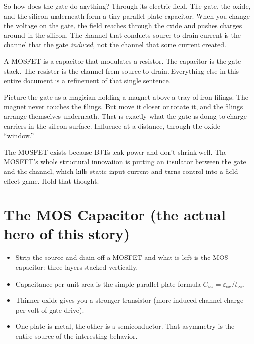 \documentclass[11pt]{article}
\begin{document}
So how does the gate do anything? Through its electric field. The gate, the oxide, and the silicon underneath form a tiny parallel-plate capacitor. When you change the voltage on the gate, the field reaches through the oxide and pushes charges around in the silicon. The channel that conducts source-to-drain current is the channel that the gate \emph{induced}, not the channel that some current created.

\begin{keyidea}
A MOSFET is a capacitor that modulates a resistor. The capacitor is the gate stack. The resistor is the channel from source to drain. Everything else in this entire document is a refinement of that single sentence.
\end{keyidea}

\begin{hook}
Picture the gate as a magician holding a magnet above a tray of iron filings. The magnet never touches the filings. But move it closer or rotate it, and the filings arrange themselves underneath. That is exactly what the gate is doing to charge carriers in the silicon surface. Influence at a distance, through the oxide ``window.''
\end{hook}

\begin{checkpoint}
The MOSFET exists because BJTs leak power and don't shrink well. The MOSFET's whole structural innovation is putting an insulator between the gate and the channel, which kills static input current and turns control into a field-effect game. Hold that thought.
\end{checkpoint}

\section{The MOS Capacitor (the actual hero of this story)}

\begin{tldr}
\begin{itemize}[leftmargin=*]
\item Strip the source and drain off a MOSFET and what is left is the MOS capacitor: three layers stacked vertically.
\item Capacitance per unit area is the simple parallel-plate formula $C_{ox} = \varepsilon_{ox}/t_{ox}$.
\item Thinner oxide gives you a stronger transistor (more induced channel charge per volt of gate drive).
\item One plate is metal, the other is a semiconductor. That asymmetry is the entire source of the interesting behavior.
\end{itemize}
\end{tldr}
\end{document}
